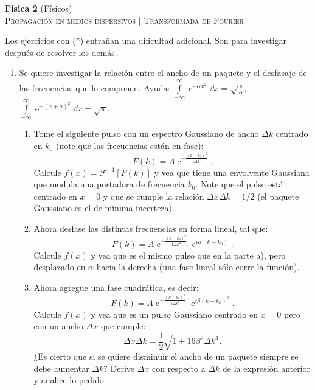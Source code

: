 \documentclass[11pt,spanish,a4paper]{article}
\begin{document}
\begin{center}
\textbf{Física 2} (Físicos) \hfill {}\\
	\textsc{\LARGE Propagación en medios dispersivos | Transformada de Fourier}
\end{center}

Los ejercicios con (*) entrañan una dificultad adicional. Son para investigar después de resolver los demás.



\begin{enumerate}

								
\section*{Transformada de Fourier}

\item Se quiere investigar la relación entre el ancho de un paquete y el desfasaje de las frecuencias que lo componen.
Ayuda: \( \int\limits_{-\infty}^{\infty} \operatorname{e}^{-\alpha x^2} \dd{x} = \sqrt{\frac{\pi}{\alpha} } \), \( \int\limits_{-\infty}^{\infty} \operatorname{e}^{-(x+ a)^2} \dd{x} = \sqrt{\pi}\).
\begin{enumerate}
	\item Tome el siguiente pulso con un espectro Gaussiano de ancho $\Delta k$ centrado en $k_0$ (note que las frecuencias están en fase):
$$
F(k)=A \operatorname{e}^{-\frac{ ( k - k_0 )^2 }{ 4 \Delta k^2 } }.
$$
Calcule $f(x) = \mathcal{F}^{-1}[F(k)]$ y vea que tiene una envolvente Gaussiana que modula una portadora de frecuencia $k_{0}$.
Note que el pulso está centrado en $x=0$ y que se cumple la relación $\Delta x \Delta k = 1/2$ (el paquete Gaussiano es el de mínima incerteza).
	\item Ahora desfase las distintas frecuencias en forma lineal, tal que:
$$
F(k)=A \operatorname{e}^{ -\frac{ ( k - k_0 )^2 }{ 4 \Delta k^2 } } \operatorname{e}^{ i \alpha (k - k_0 ) }.
$$
Calcule $f(x)$ y vea que es el mismo pulso que en la parte a), pero desplazado en $\alpha$ hacia la derecha (una fase lineal sólo corre la función).
	\item Ahora agregue una fase cuadrática, es decir:
$$
F(k) = A \operatorname{e}^{-\frac{(k-k_{0})^{2}}{4\Delta k^{2}} } \operatorname{e}^{i \beta ( k - k_0 )^2 }.
$$
Calcule $f(x)$ y vea que es un pulso Gaussiano centrado en $x=0$ pero con un ancho $\Delta x$ que cumple:
$$
\Delta x \Delta k = \frac{1}{2} \sqrt{ 1 + 16 \beta^2 \Delta k^4 }.
$$
¿Es cierto que si se quiere disminuir el ancho de un paquete siempre se debe aumentar $\Delta k$?
Derive $\Delta x$ con respecto a $\Delta k$ de la expresión anterior y analice lo pedido.
\end{enumerate}



\end{enumerate}
\end{document}
